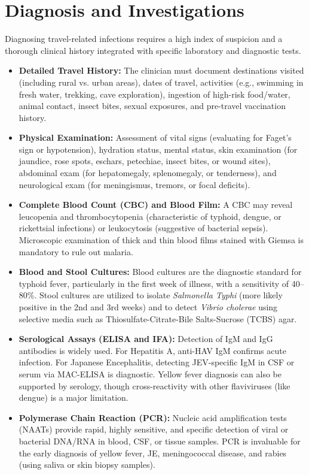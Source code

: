 \section*{Diagnosis and Investigations}
Diagnosing travel-related infections requires a high index of suspicion and a thorough clinical history integrated with specific laboratory and diagnostic tests.
\begin{itemize}
    \item \textbf{Detailed Travel History:} The clinician must document destinations visited (including rural vs. urban areas), dates of travel, activities (e.g., swimming in fresh water, trekking, cave exploration), ingestion of high-risk food/water, animal contact, insect bites, sexual exposures, and pre-travel vaccination history.
    \item \textbf{Physical Examination:} Assessment of vital signs (evaluating for Faget's sign or hypotension), hydration status, mental status, skin examination (for jaundice, rose spots, eschars, petechiae, insect bites, or wound sites), abdominal exam (for hepatomegaly, splenomegaly, or tenderness), and neurological exam (for meningismus, tremors, or focal deficits).
    \item \textbf{Complete Blood Count (CBC) and Blood Film:} A CBC may reveal leucopenia and thrombocytopenia (characteristic of typhoid, dengue, or rickettsial infections) or leukocytosis (suggestive of bacterial sepsis). Microscopic examination of thick and thin blood films stained with Giemsa is mandatory to rule out malaria.
    \item \textbf{Blood and Stool Cultures:} Blood cultures are the diagnostic standard for typhoid fever, particularly in the first week of illness, with a sensitivity of 40--80\%. Stool cultures are utilized to isolate \textit{Salmonella Typhi} (more likely positive in the 2nd and 3rd weeks) and to detect \textit{Vibrio cholerae} using selective media such as Thiosulfate-Citrate-Bile Salts-Sucrose (TCBS) agar.
    \item \textbf{Serological Assays (ELISA and IFA):} Detection of IgM and IgG antibodies is widely used. For Hepatitis A, anti-HAV IgM confirms acute infection. For Japanese Encephalitis, detecting JEV-specific IgM in CSF or serum via MAC-ELISA is diagnostic. Yellow fever diagnosis can also be supported by serology, though cross-reactivity with other flaviviruses (like dengue) is a major limitation.
    \item \textbf{Polymerase Chain Reaction (PCR):} Nucleic acid amplification tests (NAATs) provide rapid, highly sensitive, and specific detection of viral or bacterial DNA/RNA in blood, CSF, or tissue samples. PCR is invaluable for the early diagnosis of yellow fever, JE, meningococcal disease, and rabies (using saliva or skin biopsy samples).

\end{itemize}
